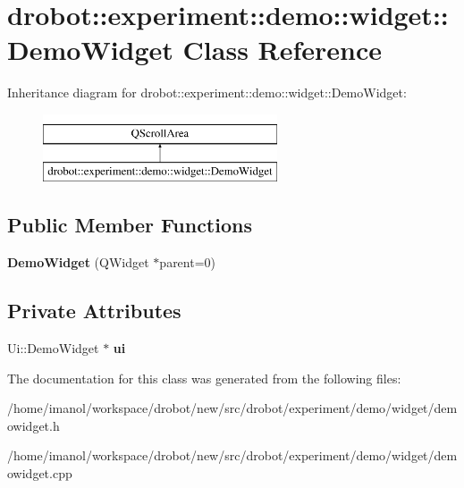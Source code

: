 \hypertarget{classdrobot_1_1experiment_1_1demo_1_1widget_1_1DemoWidget}{\section{drobot\-:\-:experiment\-:\-:demo\-:\-:widget\-:\-:Demo\-Widget Class Reference}
\label{classdrobot_1_1experiment_1_1demo_1_1widget_1_1DemoWidget}
}
Inheritance diagram for drobot\-:\-:experiment\-:\-:demo\-:\-:widget\-:\-:Demo\-Widget\-:\begin{figure}[H]
\begin{center}
\leavevmode
\includegraphics[height=2.000000cm]{classdrobot_1_1experiment_1_1demo_1_1widget_1_1DemoWidget}
\end{center}
\end{figure}
\subsection*{Public Member Functions}
\begin{DoxyCompactItemize}
\item 
\hypertarget{classdrobot_1_1experiment_1_1demo_1_1widget_1_1DemoWidget_a13ca1457721010550cc52f6fe14dd026}{{\bfseries Demo\-Widget} (Q\-Widget $\ast$parent=0)}\label{classdrobot_1_1experiment_1_1demo_1_1widget_1_1DemoWidget_a13ca1457721010550cc52f6fe14dd026}

\end{DoxyCompactItemize}
\subsection*{Private Attributes}
\begin{DoxyCompactItemize}
\item 
\hypertarget{classdrobot_1_1experiment_1_1demo_1_1widget_1_1DemoWidget_afe70d90c001ca0a86d22ee431f64840f}{Ui\-::\-Demo\-Widget $\ast$ {\bfseries ui}}\label{classdrobot_1_1experiment_1_1demo_1_1widget_1_1DemoWidget_afe70d90c001ca0a86d22ee431f64840f}

\end{DoxyCompactItemize}


The documentation for this class was generated from the following files\-:\begin{DoxyCompactItemize}
\item 
/home/imanol/workspace/drobot/new/src/drobot/experiment/demo/widget/demowidget.\-h\item 
/home/imanol/workspace/drobot/new/src/drobot/experiment/demo/widget/demowidget.\-cpp\end{DoxyCompactItemize}
